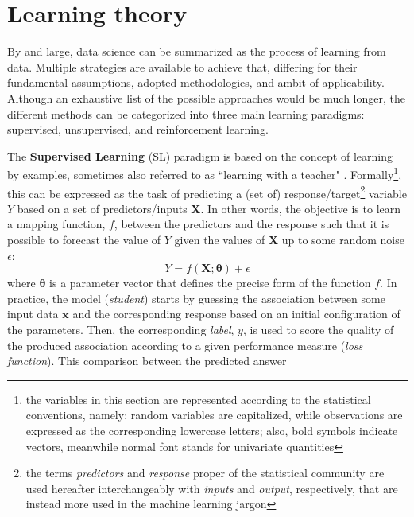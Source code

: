 \section{Learning theory}
\label{sec:learning}

By and large, data science can be summarized as the process of learning from data.
Multiple strategies are available to achieve that, differing for their fundamental assumptions, adopted methodologies, and ambit of applicability.
Although an exhaustive list of the possible approaches would be much longer, the different methods can be categorized into three main learning paradigms: supervised, unsupervised, and reinforcement learning.

The \textbf{Supervised Learning} (SL) paradigm is based on the concept of learning by examples, sometimes also referred to as ``learning with a teacher" \cite[Chapter 14]{friedman2009elements}.
Formally\footnote{\label{var_format} the variables in this section are represented according to the statistical conventions, namely: random variables are capitalized, while observations are expressed as the corresponding lowercase letters; also, bold symbols indicate vectors, meanwhile normal font stands for univariate quantities}, this can be expressed as the task of predicting a (set of) response/target\footnote{\label{var_naming} the terms \textit{predictors} and \textit{response} proper of the statistical community are used hereafter interchangeably with \textit{inputs} and \textit{output}, respectively, that are instead more used in the machine learning jargon} variable $Y$ based on a set of predictors/inputs $\boldsymbol X$.
In other words, the objective is to learn a mapping function, $f$, between the predictors and the response such that it is possible to forecast the value of $Y$ given the values of $\boldsymbol X$ up to some random noise $\epsilon$:
\begin{equation}
    Y = f \left(\boldsymbol X; \boldsymbol \theta \right) + \epsilon
\end{equation}
where $\boldsymbol \theta$ is a parameter vector that defines the precise form of the function $f$.
In practice, the model (\textit{student}) starts by guessing the association between some input data $\boldsymbol x$ and the corresponding response based on an initial configuration of the parameters. Then, the corresponding \textit{label}, $y$, is used to score the quality of the produced association according to a given performance measure (\textit{loss function}).
This comparison between the predicted answer 
